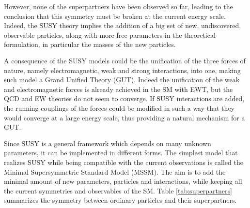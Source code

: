 However, none of the superpartners have been observed so far, leading to the conclusion that this symmetry must be broken at the current energy scale. Indeed, the SUSY theory implies the addition of a big set of new, undiscovered, observable particles, along with more free parameters in the theoretical formulation, in particular the masses of the new particles.\newline

A consequence of the SUSY models could be the unification of the three forces of nature, namely electromagnetic, weak and strong interactions, into one, making such model a Grand Unified Theory (GUT). Indeed the unification of the weak and electromagnetic forces is already achieved in the SM with EWT, but the QCD and EW theories do not seem to converge. If SUSY interactions are added, the running couplings of the forces could be modified in such a way that they would converge at a large energy scale, thus providing a natural mechanism for a GUT.\newline

Since SUSY is a general framework which depends on many unknown parameters, it can be implemented in different forms. The simplest model that realizes SUSY while being compatible with the current observations is called the Minimal Supersymmetric Standard Model (MSSM). The aim is to add the minimal amount of new parameters, particles and interactions, while keeping all the current symmetries and observables of the SM. Table \ref{tab:superpartners} summarizes the symmetry between ordinary particles and their superpartners.

